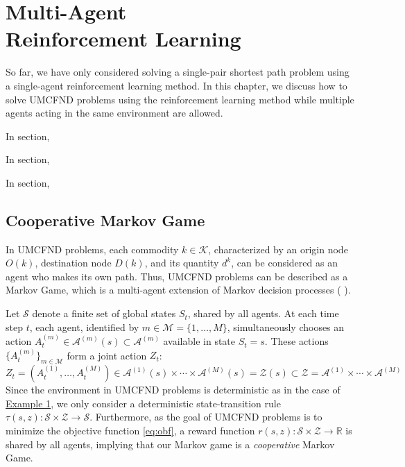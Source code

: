 \chapter[Multi-Agent Reinforcement Learning]{Multi-Agent\\ Reinforcement Learning}
\label{chap: Multi-agent RL}
\vspace{1cm}

So far, we have only considered solving a single-pair shortest path problem using a single-agent reinforcement learning method. In this chapter, we discuss how to solve UMCFND problems using the reinforcement learning method while multiple agents acting in the same environment are allowed.

In section,

In section,

In section, 


\clearpage
\section{Cooperative Markov Game}
In UMCFND problems, each commodity $k \in \mathcal{K}$,  characterized by an origin node $O(k)$, destination node $D(k)$, and its quantity $d^k$, can be considered as an agent who makes its own path. Thus, UMCFND problems can be described as a Markov Game, which is a multi-agent extension of Markov decision processes (\citeauthor{littman1994markov} \cite{littman1994markov}).

Let $\mathcal{S}$ denote a finite set of global states $S_t$, shared by all agents. At each time step $t$, each agent, identified by $m \in \mathcal{M} = \{1, \dots, M\}$, simultaneously chooses an action $A_t^{(m)} \in \mathcal{A}^{(m)}(s) \subset \mathcal{A}^{(m)}$ available in state $S_t=s$. These actions $\{A_t^{(m)}\}_{m\in\mathcal{M}}$ form a joint action $Z_t$:
$$Z_t = (A_t^{(1)}, \dots, A_t^{(M)}) \in \mathcal{A}^{(1)}(s) \times \cdots \times \mathcal{A}^{(M)}(s) = \mathcal{Z}(s) \subset \mathcal{Z} =\mathcal{A}^{(1)}\times \cdots \times \mathcal{A}^{(M)}$$
Since the environment in UMCFND problems is deterministic as in the case of \hyperref[fig:toy graph]{Example 1}, we only consider a deterministic state-transition rule $\tau(s, z): \mathcal{S} \times \mathcal{Z} \rightarrow \mathcal{S}$. Furthermore, as the goal of UMCFND problems is to minimize the objective function \eqref{eq:obf}, a reward function $r(s,z): \mathcal{S} \times \mathcal{Z} \rightarrow \mathbb{R}$ is shared by all agents, implying that our Markov game is a \textit{cooperative} Markov Game.

